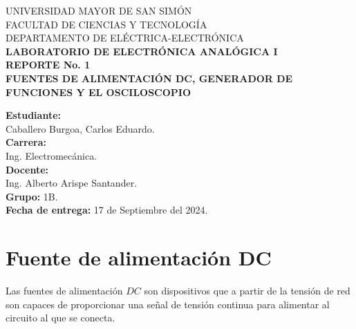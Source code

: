\documentclass[letter,twoside,11pt]{article}
\newcommand{\blankpage}{
\newpage
\thispagestyle{empty}
\mbox{}
\newpage
}
\begin{document}
\begin{titlepage}
    \begin{center}
        {\Large UNIVERSIDAD MAYOR DE SAN SIMÓN}\\
        \vspace*{0.15cm}
        {\large FACULTAD DE CIENCIAS Y TECNOLOGÍA}\\
        \vspace*{0.10cm}
        DEPARTAMENTO DE ELÉCTRICA-ELECTRÓNICA\\
        \vspace*{3.0cm}
        {\Large \textbf{LABORATORIO DE ELECTRÓNICA ANALÓGICA I}}\\
        \vspace*{0.3cm}
        {\Large \textbf{REPORTE No. 1}}\\
        \vspace*{3.5cm}
        {\Large \textbf{FUENTES DE ALIMENTACIÓN DC, GENERADOR DE \\ FUNCIONES Y EL OSCILOSCOPIO}}\\
    \end{center}

    \vspace*{5.8cm}
    \leftskip=7.95cm
    \noindent
    \textbf{Estudiante:}\\
    Caballero Burgoa, Carlos Eduardo.\\
    \newline
    \textbf{Carrera:}\\
    Ing. Electromecánica.\\
    \newline
    \textbf{Docente:}\\
    Ing. Alberto Arispe Santander.\\
    \newline
    \textbf{Grupo:} 1B.\\
    \textbf{Fecha de entrega:} 17 de Septiembre del 2024.\\
\end{titlepage}
\addtocounter{page}{-1}

\blankpage
\addtocounter{page}{-1}

\section{Fuente de alimentación DC}
Las fuentes de alimentación $DC$ son dispositivos que a partir de la tensión de
red son capaces de proporcionar una señal de tensión continua para alimentar al
circuito al que se conecta.
\end{document}
